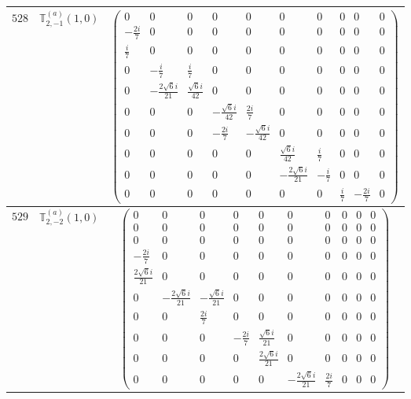 \documentclass[fleqn,8pt,landscape]{jsarticle}
\begin{document}
\begin{center}
\begin{longtable}{ccc}
$ 528 $ & $ \mathbb{T}_{2,-1}^{(a)}(1,0) $ & $ \begin{pmatrix} 0 & 0 & 0 & 0 & 0 & 0 & 0 & 0 & 0 & 0 \\ - \frac{2 i}{7} & 0 & 0 & 0 & 0 & 0 & 0 & 0 & 0 & 0 \\ \frac{i}{7} & 0 & 0 & 0 & 0 & 0 & 0 & 0 & 0 & 0 \\ 0 & - \frac{i}{7} & \frac{i}{7} & 0 & 0 & 0 & 0 & 0 & 0 & 0 \\ 0 & - \frac{2 \sqrt{6} i}{21} & \frac{\sqrt{6} i}{42} & 0 & 0 & 0 & 0 & 0 & 0 & 0 \\ 0 & 0 & 0 & - \frac{\sqrt{6} i}{42} & \frac{2 i}{7} & 0 & 0 & 0 & 0 & 0 \\ 0 & 0 & 0 & - \frac{2 i}{7} & - \frac{\sqrt{6} i}{42} & 0 & 0 & 0 & 0 & 0 \\ 0 & 0 & 0 & 0 & 0 & \frac{\sqrt{6} i}{42} & \frac{i}{7} & 0 & 0 & 0 \\ 0 & 0 & 0 & 0 & 0 & - \frac{2 \sqrt{6} i}{21} & - \frac{i}{7} & 0 & 0 & 0 \\ 0 & 0 & 0 & 0 & 0 & 0 & 0 & \frac{i}{7} & - \frac{2 i}{7} & 0 \end{pmatrix} $ \\ \hline
$ 529 $ & $ \mathbb{T}_{2,-2}^{(a)}(1,0) $ & $ \begin{pmatrix} 0 & 0 & 0 & 0 & 0 & 0 & 0 & 0 & 0 & 0 \\ 0 & 0 & 0 & 0 & 0 & 0 & 0 & 0 & 0 & 0 \\ 0 & 0 & 0 & 0 & 0 & 0 & 0 & 0 & 0 & 0 \\ - \frac{2 i}{7} & 0 & 0 & 0 & 0 & 0 & 0 & 0 & 0 & 0 \\ \frac{2 \sqrt{6} i}{21} & 0 & 0 & 0 & 0 & 0 & 0 & 0 & 0 & 0 \\ 0 & - \frac{2 \sqrt{6} i}{21} & - \frac{\sqrt{6} i}{21} & 0 & 0 & 0 & 0 & 0 & 0 & 0 \\ 0 & 0 & \frac{2 i}{7} & 0 & 0 & 0 & 0 & 0 & 0 & 0 \\ 0 & 0 & 0 & - \frac{2 i}{7} & \frac{\sqrt{6} i}{21} & 0 & 0 & 0 & 0 & 0 \\ 0 & 0 & 0 & 0 & \frac{2 \sqrt{6} i}{21} & 0 & 0 & 0 & 0 & 0 \\ 0 & 0 & 0 & 0 & 0 & - \frac{2 \sqrt{6} i}{21} & \frac{2 i}{7} & 0 & 0 & 0 \end{pmatrix} $ \\ \hline

\end{longtable}
\end{center}
\end{document}
